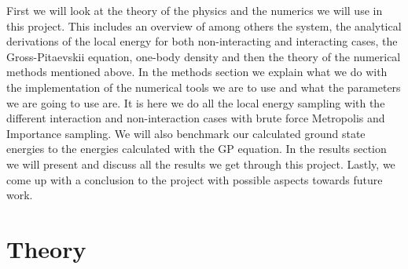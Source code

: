 \documentclass[12pt,a4paper,english]{article}
\begin{document}
First we will look at the theory of the physics and the numerics we will use in this project. This includes an overview of among others the system, the analytical derivations of the local energy for both non-interacting and interacting cases, the Gross-Pitaevskii equation, one-body density and then the theory of the numerical methods mentioned above. In the methods section we explain what we do with the implementation of the numerical tools we are to use and what the parameters we are going to use are. It is here we do all the local energy sampling with the different interaction and non-interaction cases with brute force Metropolis and Importance sampling. We will also benchmark our calculated ground state energies to the energies calculated with the GP equation. In the results section we will present and discuss all the results we get through this project. Lastly, we come up with a conclusion to the project with possible aspects towards future work.

\section{Theory}
\label{sect:Theory}
\end{document}
